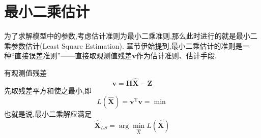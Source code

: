 \documentclass[cn,10pt,citestyle=gb7714-2015,bibstyle=gb7714-2015]{elegantbook}
\newcommand{\mT}{\mathrm{T}}
\begin{document}
\section{最小二乘估计}
为了求解模型中的参数,考虑估计准则为最小二乘准则,那么此时进行的就是最小二乘参数估计(Least Square Estimation).
章节伊始提到,最小二乘估计的准则是一种“直接误差准则”——直接取观测值残差$\bm{v}$作为估计准则、估计手段.
\begin{theorem}[最小二乘准则]\label{thm:LS-principle}
  有观测值残差
  \[
    \bm{v}=\bm{H}\hat{\bm{X}}-\bm{Z}
  \]
  先取残差平方和使之最小,即
  \begin{equation}
    L(\hat{\bm{X}})=\bm{v}^\mT\bm{v}=\min
  \end{equation}
  也就是说,最小二乘解应满足
  \begin{equation}
    \hat{\bm{X}}_{LS}=\arg\min_{\hat{X}}L(\hat{\bm{X}})
  \end{equation}
\end{theorem}
\end{document}
